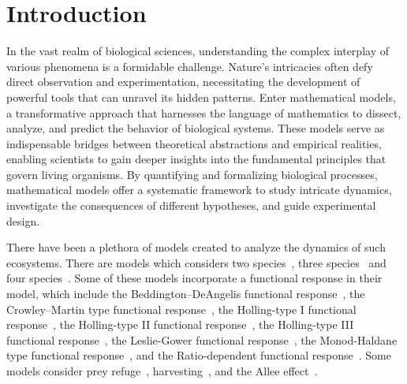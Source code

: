 
\section{Introduction}\label{sec:introduction}
In the vast realm of biological sciences, understanding the complex interplay of various phenomena is a formidable challenge. Nature's intricacies often defy direct observation and experimentation, necessitating the development of powerful tools that can unravel its hidden patterns. Enter mathematical models, a transformative approach that harnesses the language of mathematics to dissect, analyze, and predict the behavior of biological systems. These models serve as indispensable bridges between theoretical abstractions and empirical realities, enabling scientists to gain deeper insights into the fundamental principles that govern living organisms. By quantifying and formalizing biological processes, mathematical models offer a systematic framework to study intricate dynamics, investigate the consequences of different hypotheses, and guide experimental design.

There have been a plethora of models created to analyze the dynamics of such ecosystems. There are models which considers two species~\cite{GHOSH2017110, CHEN20122790, YU2012208167, HUANG2006672, AZIZALAOUI20031069, XIAO200614, SEN201212, CANTRELL2001206, CHEN20092905, CHEN2010246, KAR2005681, CHATTOPADHYAY1996287, KAR2003125}, three species~\cite{GAKKHAR201654, PANJA2022100153, MENG2014810, ALIDOUSTI2020109688, PEET2005491, SARWARDI2012133, PRIYADARSHI20133202, GAKKHAR2005105, GAKKHAR2007808, Mukherjee2013, DHAKNEMUNDE2012, CHATTOPADHYAY200345, PANJAMONDAL2015, PANJA2017389, KHAJANCHI2017193, JANA2017350} and four species~\cite{JANA2021100942}. Some of these models incorporate a functional response in their model, which include the Beddington–DeAngelis functional response~\cite{CANTRELL2001206}, the Crowley–Martin type functional response~\cite{MENG2014810}, the Holling-type I functional response~\cite{JANA2021100942, Mukherjee2013, CHATTOPADHYAY200345}, the Holling-type II functional response~\cite{GAKKHAR201654, PANJA2022100153, JANA2021100942, GHOSH2017110, YU2012208167, HUANG2006672, AZIZALAOUI20031069, CHEN2010246, SARWARDI2012133, PRIYADARSHI20133202, GAKKHAR2005105, GAKKHAR2007808, Mukherjee2013, CHATTOPADHYAY200345, PANJAMONDAL2015, JANA2017350}, the Holling-type III functional response~\cite{CHATTOPADHYAY200345}, the Leslie-Gower functional response~\cite{YU2012208167, AZIZALAOUI20031069, PRIYADARSHI20133202}, the Monod-Haldane type functional response~\cite{ALIDOUSTI2020109688}, and the Ratio-dependent functional response~\cite{XIAO200614, SEN201212, CANTRELL2001206, KHAJANCHI2017193}. Some models consider prey refuge~\cite{GAKKHAR201654, PANJA2022100153, GHOSH2017110, CHEN20122790, HUANG2006672, CHEN20092905, CHEN2010246, KAR2005681, SARWARDI2012133, Mukherjee2013, KHAJANCHI2017193, JANA2017350}, harvesting~\cite{XIAO200614, KAR2003125, PANJA2017389}, and the Allee effect~\cite{SEN201212}.

